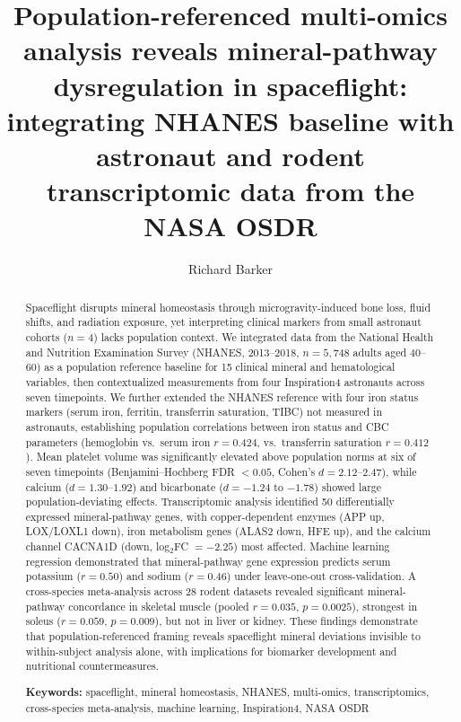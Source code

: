 \documentclass[11pt,a4paper]{article}
\title{Population-referenced multi-omics analysis reveals mineral-pathway dysregulation in spaceflight: \\
       integrating NHANES baseline with astronaut and rodent transcriptomic data from the NASA OSDR}
\author{Richard Barker}
\date{}
\begin{document}
\maketitle

\begin{abstract}
\noindent
Spaceflight disrupts mineral homeostasis through microgravity-induced bone loss, fluid shifts, and radiation exposure, yet interpreting clinical markers from small astronaut cohorts ($n=4$) lacks population context. We integrated data from the National Health and Nutrition Examination Survey (NHANES, 2013--2018, $n=5{,}748$ adults aged 40--60) as a population reference baseline for 15 clinical mineral and hematological variables, then contextualized measurements from four Inspiration4 astronauts across seven timepoints. We further extended the NHANES reference with four iron status markers (serum iron, ferritin, transferrin saturation, TIBC) not measured in astronauts, establishing population correlations between iron status and CBC parameters (hemoglobin vs.\ serum iron $r = 0.424$, vs.\ transferrin saturation $r = 0.412$). Mean platelet volume was significantly elevated above population norms at six of seven timepoints (Benjamini--Hochberg FDR $< 0.05$, Cohen's $d = 2.12$--$2.47$), while calcium ($d = 1.30$--$1.92$) and bicarbonate ($d = -1.24$ to $-1.78$) showed large population-deviating effects. Transcriptomic analysis identified 50 differentially expressed mineral-pathway genes, with copper-dependent enzymes (APP up, LOX/LOXL1 down), iron metabolism genes (ALAS2 down, HFE up), and the calcium channel CACNA1D (down, log$_2$FC $= -2.25$) most affected. Machine learning regression demonstrated that mineral-pathway gene expression predicts serum potassium ($r = 0.50$) and sodium ($r = 0.46$) under leave-one-out cross-validation. A cross-species meta-analysis across 28 rodent datasets revealed significant mineral-pathway concordance in skeletal muscle (pooled $r = 0.035$, $p = 0.0025$), strongest in soleus ($r = 0.059$, $p = 0.009$), but not in liver or kidney. These findings demonstrate that population-referenced framing reveals spaceflight mineral deviations invisible to within-subject analysis alone, with implications for biomarker development and nutritional countermeasures.

\medskip
\noindent\textbf{Keywords:} spaceflight, mineral homeostasis, NHANES, multi-omics, transcriptomics, cross-species meta-analysis, machine learning, Inspiration4, NASA OSDR
\end{abstract}
\end{document}

